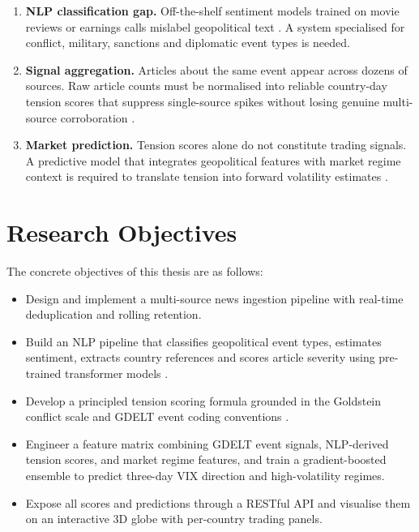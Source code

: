 \documentclass[12pt,a4paper]{report}
\begin{document}
\begin{enumerate}
  \item \textbf{NLP classification gap.} Off-the-shelf sentiment models
        trained on movie reviews or earnings calls mislabel geopolitical
        text \cite{loughran2011, araci2019}. A system specialised for
        conflict, military, sanctions and diplomatic event types is needed.
  \item \textbf{Signal aggregation.} Articles about the same event appear
        across dozens of sources. Raw article counts must be normalised into
        reliable country-day tension scores that suppress single-source
        spikes without losing genuine multi-source corroboration \cite{manela2017}.
  \item \textbf{Market prediction.} Tension scores alone do not constitute
        trading signals. A predictive model that integrates geopolitical
        features with market regime context is required to translate tension
        into forward volatility estimates \cite{nassirtoussi2014, friedman2001}.
\end{enumerate}

\section{Research Objectives}

The concrete objectives of this thesis are as follows:

\begin{itemize}
  \item Design and implement a multi-source news ingestion pipeline with
        real-time deduplication and rolling retention.
  \item Build an NLP pipeline that classifies geopolitical event types,
        estimates sentiment, extracts country references and scores article
        severity using pre-trained transformer models \cite{lewis2020, devlin2019}.
  \item Develop a principled tension scoring formula grounded in the
        Goldstein conflict scale \cite{goldstein1992} and GDELT event
        coding conventions \cite{leetaru2013, schrodt2012}.
  \item Engineer a feature matrix combining GDELT event signals, NLP-derived
        tension scores, and market regime features, and train a gradient-boosted
        ensemble \cite{ke2017,
        chen2016, prokhorenkova2018} to predict three-day VIX direction
        and high-volatility regimes.
  \item Expose all scores and predictions through a RESTful API and
        visualise them on an interactive 3D globe with per-country
        trading panels.
\end{itemize}
\end{document}
